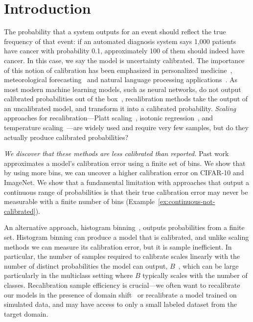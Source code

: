 
\section{Introduction}

The probability that a system outputs for an event should reflect the true frequency of that event: if an automated diagnosis system says 1,000 patients have cancer with probability 0.1, approximately 100 of them should indeed have cancer.
In this case, we say the model is uncertainty calibrated. The importance of this notion of calibration has been emphasized in personalized medicine~\cite{jiang2012calibrating}, meteorological forecasting~\cite{murphy1973vector, murphy1977reliability, degroot1983forecasters,gneiting2005weather, brocker2009decomposition} and natural language processing applications~\cite{nguyen2015posterior, card2018calibration}.
As most modern machine learning models, such as neural networks, do not output calibrated probabilities out of the box~\cite{guo2017calibration, zadrozny2001calibrated, kuleshov2018accurate},  recalibration methods take the output of an uncalibrated model, and transform it into a calibrated probability.
\emph{Scaling} approaches for recalibration---Platt scaling~\cite{platt1999probabilistic}, isotonic regression~\cite{zadrozny2002transforming}, and temperature scaling~\cite{guo2017calibration}---are widely used and require very few samples, but do they actually produce calibrated probabilities?

\emph{We discover that these methods are less calibrated than reported.} Past work approximates a model's calibration error using a finite set of bins. We show that by using more bins, we can uncover a higher calibration error  on CIFAR-10 and ImageNet.
We show that a fundamental limitation with approaches that output a continuous range of probabilities is that their true calibration error  may never be measurable with a finite number of bins (Example~\ref{ex:continuous-not-calibrated}).

An alternative approach, histogram binning~\cite{zadrozny2001calibrated}, outputs probabilities from a finite set.
Histogram binning can produce a model that is calibrated, and unlike scaling methods we can measure its calibration error, but it is sample inefficient.
In particular, the number of samples required to calibrate scales linearly with the number of distinct probabilities the model can output, $B$~\cite{naeini2014binary}, which can be large particularly in the multiclass setting where $B$ typically scales with the number of classes.
Recalibration sample efficiency is crucial---we often want to recalibrate our models in the presence of domain shift~\cite{hendrycks2019anomaly} or recalibrate a model trained on simulated data, and may have access to only a small labeled dataset from the target domain.

